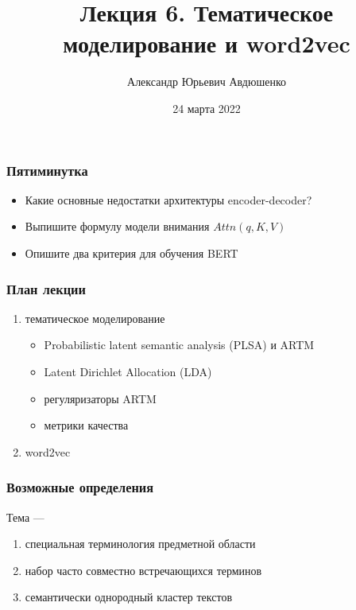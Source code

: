 \documentclass[fullscreen=true, bookmarks=true, hyperref={pdfencoding=unicode}]{beamer}
\title{Лекция 6. Тематическое моделирование и word2vec}
\author{Александр Юрьевич Авдюшенко}
\institute{МКН СПбГУ}
\date{24 марта 2022}
\begin{document}

\begin{frame}
\transdissolve[duration=0.2]
\titlepage
\end{frame}


\begin{frame}
  \frametitle{Пятиминутка}
  \begin{itemize}
    \item Какие основные недостатки архитектуры encoder-decoder?
    \item Выпишите формулу модели внимания $Attn(q,K,V)$
    \item Опишите два критерия для обучения BERT
  \end{itemize}
\end{frame}


\begin{frame}
  \frametitle{План лекции}
  \begin{enumerate}
    \item тематическое моделирование
    \begin{itemize}
      \item Probabilistic latent semantic analysis (PLSA) и ARTM
      \item Latent Dirichlet Allocation (LDA)
      \item регуляризаторы ARTM
      \item метрики качества
    \end{itemize}
    \item word2vec
    \end{enumerate}
\end{frame}


\begin{frame}
  \frametitle{Возможные определения}

  Тема —
  \begin{enumerate}
    \item специальная терминология предметной области
    \item набор часто совместно встречающихся терминов
    \item семантически однородный кластер текстов
  \end{enumerate}
\end{frame}
\end{document}
